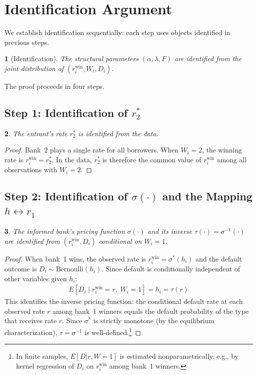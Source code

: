 \documentclass[12pt]{article}
\theoremstyle{plain}
\newtheorem{thm}{\protect\theoremname}
\theoremstyle{plain}
\newtheorem{prop}[thm]{\protect\propositionname}
\theoremstyle{definition}  %
\theoremstyle{remark}  %
\providecommand{\propositionname}{Proposition}
\providecommand{\theoremname}{Theorem}
\begin{document}
\section{Identification Argument}\label{sec:id}

We establish identification sequentially: each step uses objects identified in previous steps.

\begin{thm}[Identification]\label{thm:id}
The structural parameters $(\alpha, \lambda, F)$ are identified from the joint distribution of $(r_i^{\text{win}}, W_i, D_i)$.
\end{thm}

The proof proceeds in four steps.

\subsection{Step 1: Identification of $r_2^*$}

\begin{prop}\label{prop:r2}
The entrant's rate $r_2^*$ is identified from the data.
\end{prop}

\begin{proof}
Bank~2 plays a single rate for all borrowers. When $W_i = 2$, the winning rate is $r_i^{\text{win}} = r_2^*$. In the data, $r_2^*$ is therefore the common value of $r_i^{\text{win}}$ among all observations with $W_i = 2$.
\end{proof}


\subsection{Step 2: Identification of $\sigma(\cdot)$ and the Mapping $h \leftrightarrow r_1$}

\begin{prop}\label{prop:sigma}
The informed bank's pricing function $\sigma(\cdot)$ and its inverse $\tau(\cdot) = \sigma^{-1}(\cdot)$ are identified from $(r_i^{\text{win}}, D_i)$ conditional on $W_i = 1$.
\end{prop}

\begin{proof}
When bank~1 wins, the observed rate is $r_i^{\text{win}} = \sigma^*(h_i)$ and the default outcome is $D_i \sim \text{Bernoulli}(h_i)$. Since default is conditionally independent of other variables given $h_i$:
\begin{align}\label{eq:h_from_D}
    E[D_i \mid r_i^{\text{win}} = r,\; W_i = 1] = h_i = \tau(r)
\end{align}
This identifies the inverse pricing function: the conditional default rate at each observed rate $r$ among bank~1 winners equals the default probability of the type that receives rate $r$. Since $\sigma^*$ is strictly monotone (by the equilibrium characterization), $\tau = \sigma^{-1}$ is well-defined.\footnote{In finite samples, $E[D|r, W=1]$ is estimated nonparametrically, e.g., by kernel regression of $D_i$ on $r_i^{\text{win}}$ among bank~1 winners.}
\end{proof}
\end{document}
